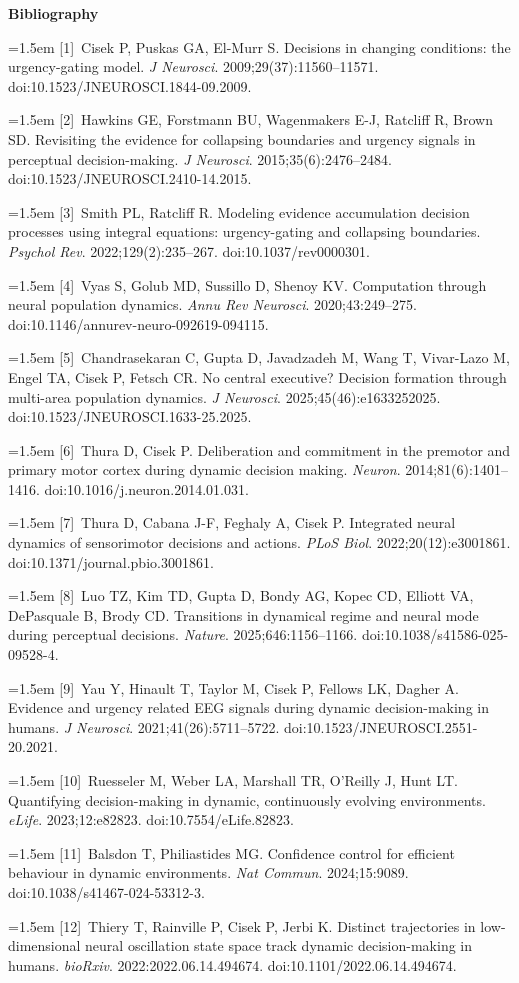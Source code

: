 \documentclass[12pt,letterpaper]{article}
\newcommand{\bibitemn}[2]{\noindent\hangindent=1.5em\hangafter=1 [#1]~#2\par\vspace{1pt}}
\begin{document}
\begin{center}\textbf{Bibliography}\end{center}\vspace{-4pt}
\bibitemn{1}{Cisek P, Puskas GA, El-Murr S. Decisions in changing conditions: the urgency-gating model. \textit{J Neurosci}. 2009;29(37):11560--11571. doi:10.1523/JNEUROSCI.1844-09.2009.}
\bibitemn{2}{Hawkins GE, Forstmann BU, Wagenmakers E-J, Ratcliff R, Brown SD. Revisiting the evidence for collapsing boundaries and urgency signals in perceptual decision-making. \textit{J Neurosci}. 2015;35(6):2476--2484. doi:10.1523/JNEUROSCI.2410-14.2015.}
\bibitemn{3}{Smith PL, Ratcliff R. Modeling evidence accumulation decision processes using integral equations: urgency-gating and collapsing boundaries. \textit{Psychol Rev}. 2022;129(2):235--267. doi:10.1037/rev0000301.}
\bibitemn{4}{Vyas S, Golub MD, Sussillo D, Shenoy KV. Computation through neural population dynamics. \textit{Annu Rev Neurosci}. 2020;43:249--275. doi:10.1146/annurev-neuro-092619-094115.}
\bibitemn{5}{Chandrasekaran C, Gupta D, Javadzadeh M, Wang T, Vivar-Lazo M, Engel TA, Cisek P, Fetsch CR. No central executive? Decision formation through multi-area population dynamics. \textit{J Neurosci}. 2025;45(46):e1633252025. doi:10.1523/JNEUROSCI.1633-25.2025.}
\bibitemn{6}{Thura D, Cisek P. Deliberation and commitment in the premotor and primary motor cortex during dynamic decision making. \textit{Neuron}. 2014;81(6):1401--1416. doi:10.1016/j.neuron.2014.01.031.}
\bibitemn{7}{Thura D, Cabana J-F, Feghaly A, Cisek P. Integrated neural dynamics of sensorimotor decisions and actions. \textit{PLoS Biol}. 2022;20(12):e3001861. doi:10.1371/journal.pbio.3001861.}
\bibitemn{8}{Luo TZ, Kim TD, Gupta D, Bondy AG, Kopec CD, Elliott VA, DePasquale B, Brody CD. Transitions in dynamical regime and neural mode during perceptual decisions. \textit{Nature}. 2025;646:1156--1166. doi:10.1038/s41586-025-09528-4.}
\bibitemn{9}{Yau Y, Hinault T, Taylor M, Cisek P, Fellows LK, Dagher A. Evidence and urgency related EEG signals during dynamic decision-making in humans. \textit{J Neurosci}. 2021;41(26):5711--5722. doi:10.1523/JNEUROSCI.2551-20.2021.}
\bibitemn{10}{Ruesseler M, Weber LA, Marshall TR, O'Reilly J, Hunt LT. Quantifying decision-making in dynamic, continuously evolving environments. \textit{eLife}. 2023;12:e82823. doi:10.7554/eLife.82823.}
\bibitemn{11}{Balsdon T, Philiastides MG. Confidence control for efficient behaviour in dynamic environments. \textit{Nat Commun}. 2024;15:9089. doi:10.1038/s41467-024-53312-3.}
\bibitemn{12}{Thiery T, Rainville P, Cisek P, Jerbi K. Distinct trajectories in low-dimensional neural oscillation state space track dynamic decision-making in humans. \textit{bioRxiv}. 2022:2022.06.14.494674. doi:10.1101/2022.06.14.494674.}
\end{document}
